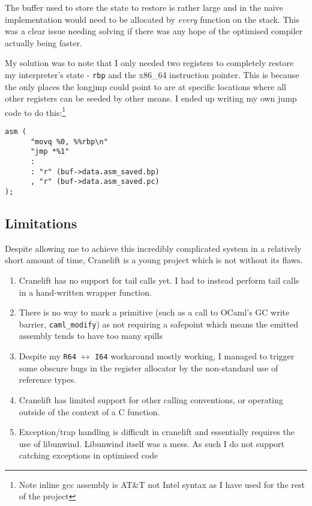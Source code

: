 The buffer used to store the state to restore is rather large and in the naive implementation would
need to be allocated by \emph{every} function on the stack. This was a clear issue needing solving
if there was any hope of the optimised compiler actually being faster.

My solution was to note that I only needed two registers to completely restore my interpreter's
state - \texttt{rbp} and the x86\_64 instruction pointer. This is because the only places the
longjmp could point to are at specific locations where all other registers can be seeded by other
means. I ended up writing my own jump code to do this:\footnote{Note inline gcc assembly is AT\&T
      not Intel
      syntax as I have used for the rest of the project}

\begin{verbatim}
asm (
      "movq %0, %%rbp\n"
      "jmp *%1"
      :
      : "r" (buf->data.asm_saved.bp)
      , "r" (buf->data.asm_saved.pc)
);
\end{verbatim}

\subsection{Limitations}

Despite allowing me to achieve this incredibly complicated system in a relatively short amount of
time, Cranelift is a young project which is not without its flaws.

\begin{enumerate}
      \item Cranelift has no support for tail calls yet. I had to instead perform tail calls in a
            hand-written wrapper function.
      \item There is no way to mark a primitive (such as a call to OCaml's GC write barrier,
            \texttt{caml\_modify}) as not requiring a safepoint which means the emitted assembly
            tends to have
            too many spills
      \item Despite my \texttt{R64} $\leftrightarrow$ \texttt{I64} workaround mostly working, I
            managed to trigger some obscure bugs in the register allocator by the non-standard use
            of reference
            types.
      \item Cranelift has limited support for other calling conventions, or operating outside of
            the context of a C function.
      \item Exception/trap handling is difficult in cranelift and essentially requires the use of
            libunwind. Libunwind itself was a mess. As such I do not support catching exceptions in
            optimised
            code
\end{enumerate}

